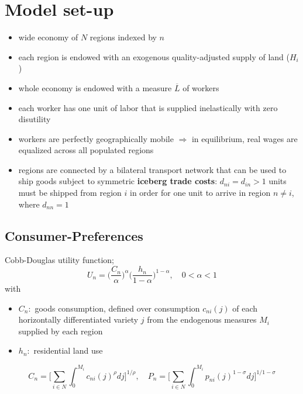 \documentclass[11pt]{article}
\begin{document}
\section*{Model set-up}
\begin{itemize}
\item wide economy of $N$ regions indexed by $n$
\item each region is endowed with an exogenous quality-adjusted supply of land ($H_{i}$) 
\item whole economy is endowed with a measure $\overline{L}$ of workers
\item each worker has one unit of labor that is supplied inelastically with zero disutility
\item workers are perfectly geographically mobile $\Rightarrow$ in equilibrium, real wages are equalized across all populated regions
\item regions are connected by a bilateral transport network that can be used to ship goods subject to symmetric \textbf{iceberg trade costs}:  $d_{ni} = d_{in} >1$ units must be shipped from region $i$ in order for one unit to arrive in region $n \neq i$, where $d_{nn}=1$
\end{itemize}

\subsection*{Consumer-Preferences}
Cobb-Douglas utility function;
\begin{equation}
U_{n} = \Big( \frac{C_{n}}{\alpha} \Big)^{\alpha} \Big( \frac{h_{n}}{1 - \alpha} \Big)^{1 - \alpha}, \quad 0 < \alpha < 1
\end{equation}
with 
\begin{itemize}
\item $C_{n}:$ goods consumption, defined over consumption $c_{ni}(j)$ of each horizontally differentiated variety $j$ from the endogenous measures $M_{i}$ supplied by each region
\item $h_{n}:$ residential land use
\end{itemize}
\begin{equation} \label{PI_CI}
C_{n} = \Big[ \sum_{i \in N} \int^{M_{i}}_{0} c_{ni}(j)^{\rho} dj \Big]^{1/\rho}, \quad P_{n} = \Big[ \sum_{i \in N} \int^{M_{i}}_{0} p_{ni}(j)^{1 - \sigma } dj \Big]^{1/1-\sigma}
\end{equation}
\end{document}
